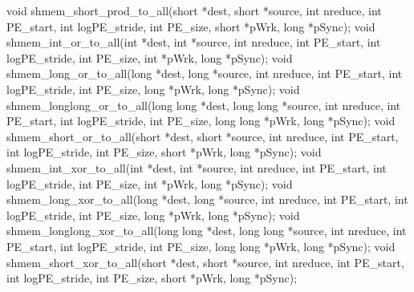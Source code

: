 void shmem_short_prod_to_all(short *dest, short *source, int nreduce, int PE_start, int logPE_stride, int PE_size, short *pWrk, long *pSync);
void shmem_int_or_to_all(int *dest, int *source, int nreduce, int PE_start, int logPE_stride, int PE_size, int *pWrk, long *pSync);
void shmem_long_or_to_all(long *dest, long *source, int nreduce, int PE_start, int logPE_stride, int PE_size, long *pWrk, long *pSync);
void shmem_longlong_or_to_all(long long *dest, long long *source, int nreduce, int PE_start, int logPE_stride, int PE_size, long long *pWrk, long *pSync);
void shmem_short_or_to_all(short *dest, short *source, int nreduce, int PE_start, int logPE_stride, int PE_size, short *pWrk, long *pSync);
void shmem_int_xor_to_all(int *dest, int *source, int nreduce, int PE_start, int logPE_stride, int PE_size, int *pWrk, long *pSync);
void shmem_long_xor_to_all(long *dest, long *source, int nreduce, int PE_start, int logPE_stride, int PE_size, long *pWrk, long *pSync);
void shmem_longlong_xor_to_all(long long *dest, long long *source, int nreduce, int PE_start, int logPE_stride, int PE_size, long long *pWrk, long *pSync);
void shmem_short_xor_to_all(short *dest, short *source, int nreduce, int PE_start, int logPE_stride, int PE_size, short *pWrk, long *pSync); %

\synF %

